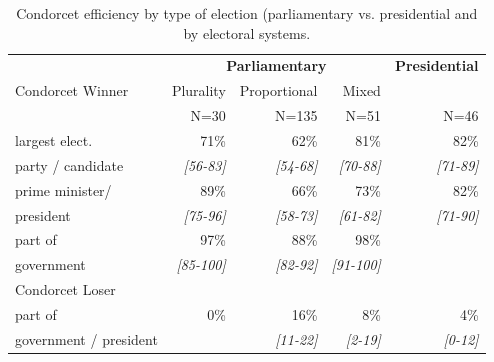 \documentclass[12pt]{scrartcl}
\begin{document}
\begin{table}[ht]
\caption{Condorcet efficiency by type of election (parliamentary vs. presidential and by electoral systems.}
\centering
\begin{tabular}{l|rrr|r} \toprule 
   & \multicolumn{3}{c|}{\textbf{Parliamentary}} & \textbf{Presidential}\\
 Condorcet Winner& Plurality  & Proportional & Mixed &  \\
                &   N=30   & N=135   & N=51    & N=46 \\ \midrule 
largest elect.& 71\%     & 62\%   &   81\% &  82\%  \\
party / candidate & \emph{[56-83]} & \emph{[54-68]} & \emph{[70-88]} & \emph{[71-89]} \\ \midrule 
   prime minister/ &   89\% &  66\% &   73\% &   82\% \\
president & \emph{[75-96]} & \emph{[58-73]} & \emph{[61-82]} & \emph{[71-90]} \\ \midrule
part of &   97\% &  88\% &   98\% &    \\
government & \emph{[85-100]} & \emph{[82-92]} & \emph{[91-100]} & \\ \midrule
Condorcet Loser & & & & \\
part of & 0\%& 16\%& 8\% & 4\%\\
government / president &  & \emph{[11-22]} & \emph{[2-19]} & \emph{[0-12]} \\
\bottomrule 
\end{tabular}
\label{tb.efficiency}
\end{table}
\end{document}
